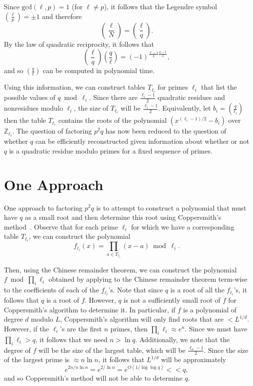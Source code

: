 \documentclass[letterpaper,twocolumn,10pt]{article}
\begin{document}
Since $\text{gcd}(\ell,p) = 1$ (for $\ell \ne p$), it follows that the Legendre symbol $\left(\frac{\ell}{p}\right) = \pm 1$ and therefore
\[
\left(\frac{\ell}{N}\right) = \left(\frac{\ell}{q}\right).
\]
By the law of quadratic reciprocity, it follows that
\[
\left(\frac{\ell}{q}\right) \left(\frac{q}{\ell}\right) = (-1)^{\frac{\ell-1}{2} \frac{q-1}{2}}, 
\]
and so $\left(\frac{q}{\ell}\right)$ can be computed in polynomial time.

Using this information, we can construct tables $T_{\ell_i}$ for primes $\ell_i$ that list the possible values of $q \bmod \ell_i$. Since there are $\frac{\ell_i - 1}{2}$ quadratic residues and nonresidues modulo $\ell_i$, the size of $T_{\ell_i}$ will be $\frac{\ell_i - 1}{2}$. Equivalently, let $b_i =  \left(\frac{q}{\ell_i}\right)$ then the table $T_{\ell_i}$ contains the roots of the polynomial $(x^{(\ell_i - 1)/2} - b_i)$ over $\mathbb{Z}_{\ell_i}$. The question of factoring $p^2 q$ has now been reduced to the question of whether $q$ can be efficiently reconstructed given information about whether or not $q$ is a quadratic residue modulo primes for a fixed sequence of primes. 

\section{One Approach}

One approach to factoring $p^2 q$ is to attempt to construct a polynomial that must have $q$ as a small root and then determine this root using Coppersmith's method~\cite{Coppersmith}. Observe that for each prime $\ell_i$ for which we have a corresponding table $T_{\ell_i}$, we can construct the polynomial
\[
f_{\ell_i}(x) = \prod_{a \in T_{\ell_i}} (x - a) \bmod \ell_i.
\]

Then, using the Chinese remainder theorem, we can construct the polynomial $f \bmod \prod_i \ell_i$ obtained by applying to the Chinese remainder theorem term-wise to the coefficients of each of the $f_{\ell_i}$'s. Note that since $q$ is a root of all the $f_{\ell_i}$'s, it follows that $q$ is a root of $f$. However, $q$ is not a sufficiently small root of $f$ for Coppersmith's algorithm to determine it. In particular, if $f$ is a polynomial of degree $d$ modulo $L$, Coppersmith's algorithm will only find roots that are $< L^{1/d}$. However, if the $\ell_i$'s are the first $n$ primes, then $\prod_i \ell_i \approx e^n$. Since we must have $\prod_i \ell_i > q$, it follows that we need $n > \ln q$. Additionally, we note that the degree of $f$ will be the size of the largest table, which will be $\frac{\ell_n - 1}{2}$. Since the size of the largest prime is $\approx n \ln n$, it follows that $L^{1/d}$ will be approximately
\[
e^{2n/n\ln n} = e^{2/\ln n} = e^{O(1/\log \log q)}  << q,
\]  
and so Coppersmith's method will not be able to determine $q$.
\end{document}
